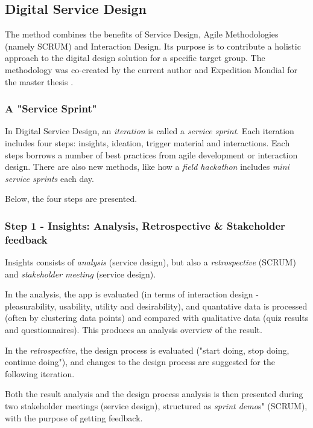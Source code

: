\subsection{Digital Service Design} \label{digital-service-design}

The method combines the benefits of Service Design, Agile Methodologies (namely SCRUM) and Interaction Design. Its purpose is to contribute a holistic approach to the digital design solution for a specific target group. The methodology was co-created by the current author and Expedition Mondial for the master thesis \citep{nissar}.

\subsubsection{A "Service Sprint"}
In Digital Service Design, an \textit{iteration} is called a \textit{service sprint}. Each iteration includes four steps: insights, ideation, trigger material and interactions. Each steps borrows a number of best practices from agile development or interaction design. There are also new methods, like how a \textit{field hackathon} includes \textit{mini service sprints} each day.

Below, the four steps are presented.

\subsubsection{Step 1 - Insights: Analysis, Retrospective \& Stakeholder feedback}
  Insights consists of \textit{analysis} (service design), but also a \textit{retrospective} (SCRUM) and \textit{stakeholder meeting} (service design).

    In the analysis, the app is evaluated (in terms of interaction design - pleasurability, usability, utility and desirability), and quantative data is processed (often by clustering data points) and compared with qualitative data (quiz results and questionnaires). This produces an analysis overview of the result.

    In the \textit{retrospective}, the design process is evaluated ("start doing, stop doing, continue doing"), and changes to the design process are suggested for the following iteration.

    Both the result analysis and the design process analysis is then presented during two stakeholder meetings (service design), structured as \textit{sprint demo}s" (SCRUM), with the purpose of getting feedback.

